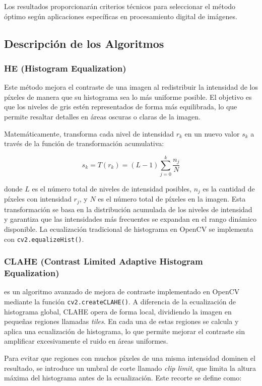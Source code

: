 \documentclass[sigchi]{acmart}
\begin{document}
Los resultados proporcionarán criterios técnicos para seleccionar el método óptimo según
aplicaciones específicas en procesamiento digital de imágenes.

\subsection{Descripción de los Algoritmos}
\label{subsec:algoritmos}

\subsubsection{\textbf{HE (Histogram Equalization)}}
\label{sssec:he}
Este método mejora el contraste de una imagen al redistribuir la
intensidad de los píxeles de manera que su histograma sea lo más uniforme posible. El objetivo
es que los niveles de gris estén representados de forma más equilibrada, lo que permite
resaltar detalles en áreas oscuras o claras de la imagen.

Matemáticamente, transforma cada nivel de intensidad $r_k$ en un nuevo valor $s_k$ a
través de la función de transformación acumulativa:

$$
	s_k = T(r_k) = (L-1)\sum_{j=0}^k \frac{n_j}{N}
$$

donde $L$ es el número total de niveles de intensidad posibles, $n_j$ es la cantidad de
píxeles con intensidad $r_j$, y $N$ es el número total de píxeles en la imagen. Esta
transformación se basa en la distribución acumulada de los niveles de intensidad y
garantiza que las intensidades más frecuentes se expandan en el rango dinámico disponible.
La ecualización tradicional de histograma en OpenCV se implementa con
\texttt{cv2.equalizeHist()}.

\subsubsection{\textbf{CLAHE (Contrast Limited Adaptive Histogram Equalization)}}
\label{sssec:clahe}
es un algoritmo avanzado de mejora de contraste implementado en OpenCV mediante la
función \texttt{cv2.createCLAHE()}. A diferencia de la ecualización de histograma global,
CLAHE opera de forma local, dividiendo la imagen en pequeñas regiones llamadas \textit{tiles}.
En cada una de estas regiones se calcula y aplica una ecualización de histograma, lo que permite
mejorar el contraste sin amplificar excesivamente el ruido en áreas uniformes.

Para evitar que regiones con muchos píxeles de una misma intensidad dominen el resultado,
se introduce un umbral de corte llamado \textit{clip limit}, que limita la altura máxima del
histograma antes de la ecualización. Este recorte se define como:
\end{document}
